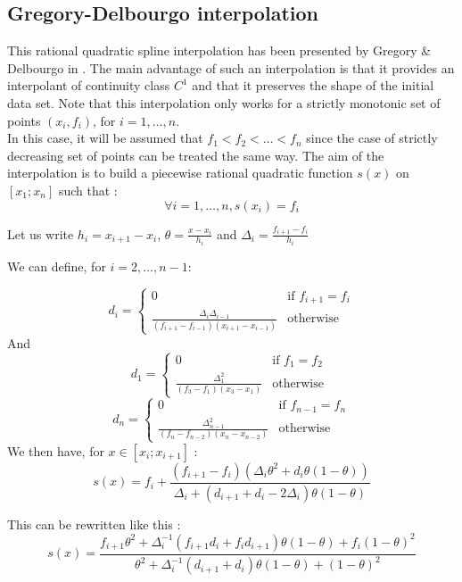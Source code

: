 \documentclass[a4paper,11pt,english]{book}
\begin{document}
\subsection{Gregory-Delbourgo interpolation}
This rational quadratic spline interpolation has been presented by Gregory \& Delbourgo in \cite{gregory1982piecewise}. The main advantage of such an interpolation is that it provides an interpolant of continuity class $C^1$ and that it preserves the shape of the initial data set. Note that this interpolation only works for a strictly monotonic set of points $(x_i,f_i)$, for $i=1,\ldots,n$. \\

In this case, it will be assumed that $f_1 < f_2 < \ldots< f_n$ since the case of strictly decreasing set of points can be treated the same way. The aim of the interpolation is to build a piecewise rational quadratic function $s(x)$ on $[x_1;x_n]$ such that :
$$\forall i=1,\ldots,n, s(x_i)=f_i$$

Let us write $h_i=x_{i+1}-x_i$, $\theta=\frac{x-x_i}{h_i}$ and $\Delta_i=\frac{f_{i+1}-f_i}{h_i}$

We can define, for $i=2,\ldots,n-1$: 

$$d_i = \begin{cases}
0 & \text{if } f_{i+1}=f_i \\
\frac{\Delta_i\Delta_{i-1}}{(f_{i+1}-f_{i-1})(x_{i+1}-x_{i-1})} & \text{otherwise }
\end{cases}$$
\vspace{0.2cm}
And 
\vspace{0.2cm}
$$d_1 = \begin{cases}
0 & \text{if } f_{1}=f_2 \\
\frac{\Delta_1^2}{(f_{3}-f_{1})(x_{3}-x_{1})} & \text{otherwise }
\end{cases}$$
\vspace{0.2cm}
$$d_n = \begin{cases}
0 & \text{if } f_{n-1}=f_n \\
\frac{\Delta_{n-1}^2}{(f_{n}-f_{n-2})(x_{n}-x_{n-2})} & \text{otherwise }
\end{cases}$$
\newpage
We then have, for $x\in [x_i;x_{i+1}]$ : $$s(x) = f_i + \frac{(f_{i+1}-f_{i})(\Delta_i\theta^2+d_i\theta(1-\theta))}{\Delta_i+(d_{i+1}+d_i-2\Delta_i)\theta(1-\theta)}$$

This can be rewritten like this :
$$s(x)=\frac{f_{i+1}\theta^2 + \Delta_i^{-1}(f_{i+1}d_i+f_id_{i+1})\theta(1-\theta)+f_i(1-\theta)^2}{\theta^2+\Delta_i^{-1}(d_{i+1}+d_i)\theta(1-\theta)+(1-\theta)^2}$$
\end{document}
